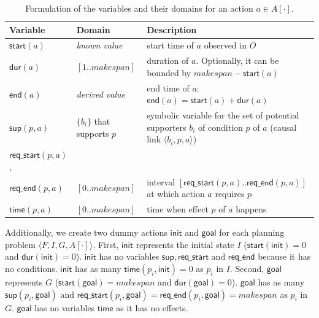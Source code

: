 \documentclass[runningheads]{llncs}
\newcommand{\tup}[1]{{\langle #1 \rangle}}
\newcommand{\dur}{\mathsf{dur}}    %
\newcommand{\start}{\mathsf{start}}%
\newcommand{\en}{\mathsf{end}}     %
\newcommand{\supp}{\mathsf{sup}}   %
\newcommand{\tim}{\mathsf{time}}   %
\newcommand{\reqs}{\mathsf{req\_{start}}} %
\newcommand{\reqe}{\mathsf{req\_{end}}}   %
\newcommand{\ini}{\mathsf{init}}   %
\newcommand{\goal}{\mathsf{goal}}  %
\begin{document}
\begin{table}
\begin{center}
\small
\begin{tabular}{p{2cm}p{2.7cm}p{7.4cm}}
Variable & Domain & Description \\

\hline


$\start(a)$ & \emph{known value} & start time of $a$ observed in $O$ \\
$\dur(a)$ & $[1..makespan]$ & duration of $a$. Optionally, it can be bounded by $makespan-\start(a)$\\
$\en(a)$ & \emph{derived value} & end time of $a$: $\en(a)=\start(a)+\dur(a)$ \\


$\supp(p,a)$ & $\{b_i\}$ that \newline supports $p$ & symbolic variable for the set of potential supporters $b_i$ of condition $p$ of $a$ (causal link $\tup{b_i,p,a}$) \\

$\reqs(p,a)$, \\
$\reqe(p,a)$ & $[0..makespan]$ & interval $[\reqs(p,a)..\reqe(p,a)]$ at which action $a$ requires $p$ \\

$\tim(p,a)$ & $[0..makespan]$ & time when effect $p$ of $a$ happens \\


\hline
\end{tabular}
\normalsize
\end{center}
\caption{Formulation of the variables and their domains for an action $a\in A[\cdot]$.}
\label{table:variables}
\end{table}


Additionally, we create two dummy actions $\ini$ and $\goal$ for each planning problem $\tup{F,I,G,A[\cdot]}$. First, $\ini$ represents the initial state $I$ ($\start(\ini)=0$ and $\dur(\ini)=0$). $\ini$ has no variables $\supp, \reqs$ and $\reqe$ because it has no conditions. $\ini$ has as many $\tim(p_i,\ini)=0$ as $p_i$ in $I$. Second, $\goal$ represents $G$ ($\start(\goal)=makespan$ and $\dur(\goal)=0$). $\goal$ has as many $\supp(p_i,\goal)$ and $\reqs(p_i,\goal)=\reqe(p_i,\goal)=makespan$ as $p_i$ in $G$. $\goal$ has no variables $\tim$ as it has no effects.
\end{document}
